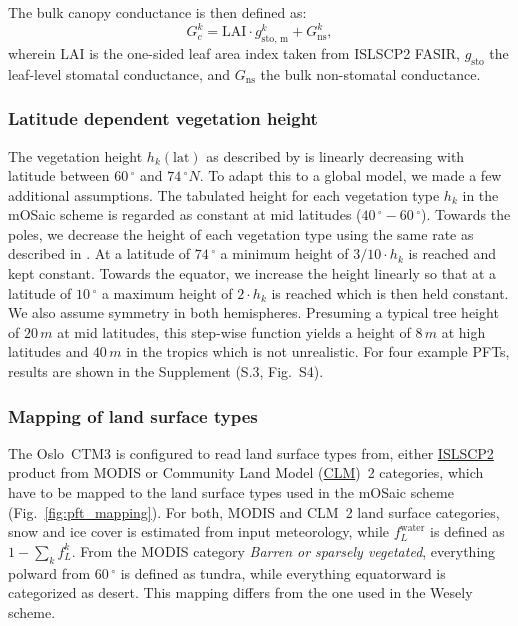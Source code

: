 \documentclass[gmd, manuscript]{copernicus}
\begin{document}
The bulk canopy conductance is then defined as:
\begin{equation}
  G_c^k = \text{LAI} \cdot g^k_\text{sto, m} + G^k_\text{ns}, 
\end{equation}
wherein $\text{LAI}$ is the one-sided leaf area index taken from ISLSCP2 FASIR, $g_\text{sto}$ the leaf-level stomatal conductance, and $G_\text{ns}$ the bulk non-stomatal conductance.\\

\subsubsection{Latitude dependent vegetation height}
The vegetation height $h_k(\text{lat})$ as described by \citet{ACP:Simpson2012} is linearly decreasing with latitude between $60\,\unit{^\circ}$ and $74\,\unit{^\circ N}$. To adapt this to a global model, we made a few additional assumptions. The tabulated height for each vegetation type $h_k$ in the mOSaic scheme is regarded as constant at mid latitudes ($40\,\unit{^\circ}-60\,\unit{^\circ}$). Towards the poles, we decrease the height of each vegetation type using the same rate as described in \citet{ACP:Simpson2012}. At a latitude of $74\,\unit{^\circ}$ a minimum height of $3/10 \cdot h_k$ is reached and kept constant. Towards the equator, we increase the height linearly so that at a latitude of $10\,\unit{^\circ}$ a maximum height of $2 \cdot h_k$ is reached which is then held constant. We also assume symmetry in both hemispheres. Presuming a typical tree height of $20\,\unit{m}$ at mid latitudes, this step-wise function yields a height of $8\,\unit{m}$ at high latitudes and $40\,\unit{m}$ in the tropics which is not unrealistic. For four example PFTs, results are shown in the Supplement (S.3, Fig.~S4). 

\subsubsection{Mapping of land surface types}
The Oslo~CTM3 is configured to read land surface types from, either \href{https://daac.ornl.gov/cgi-bin/dataset_lister.pl?p=29}{ISLSCP2} product from MODIS or Community Land Model (\href{http://www.cgd.ucar.edu/tss/clm/}{CLM})~2 categories, which have to be mapped to the land surface types used in the mOSaic scheme (Fig.~\ref{fig:pft_mapping}). For both, MODIS and CLM~2 land surface categories, snow and ice cover is estimated from input meteorology, while $f_L^\text{water}$ is defined as $1-\sum_{k} f_L^k$. From the MODIS category \emph{Barren or sparsely vegetated}, everything polward from $60\,\unit{^\circ}$ is defined as tundra, while everything equatorward is categorized as desert. This mapping differs from the one used in the Wesely scheme.
\end{document}
